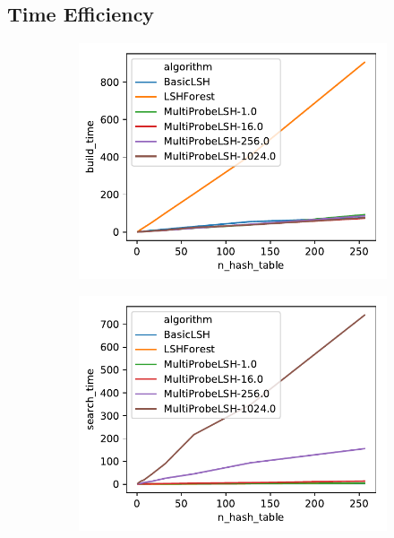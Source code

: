 \subsection{Time Efficiency}

\begin{figure}[hbt]
\label{fig:efficiency}
\begin{subfigure}{\columnwidth}
  \includegraphics[width=\columnwidth]{figures/build_time}
\end{subfigure}
\begin{subfigure}{\columnwidth}
  \includegraphics[width=\columnwidth]{figures/search_time}
\end{subfigure}
\begin{subfigure}{\columnwidth}

\end{subfigure}
\end{figure}
